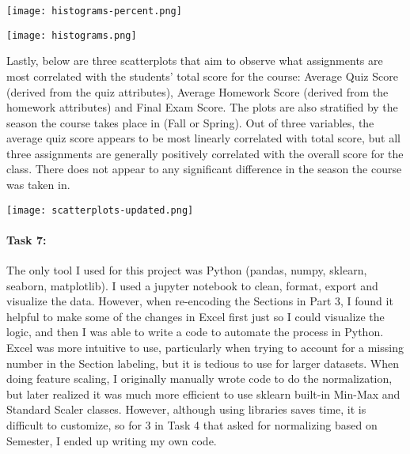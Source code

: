 \documentclass{article}
\begin{document}
\hspace*{-1.5cm}  
    \texttt{[image: histograms-percent.png]}

\hspace*{-1.5cm}  
    \texttt{[image: histograms.png]}


Lastly, below are three scatterplots that aim to observe  what assignments are most correlated with the students' total score for the course: Average Quiz Score (derived from the quiz attributes), Average Homework Score (derived from the homework attributes) and Final Exam Score. The plots are also stratified by the season the course takes place in (Fall or Spring). Out of three variables, the average quiz score appears to be most linearly correlated with total score, but all three assignments are generally positively correlated with the overall score for the class. There does not appear to any significant difference in the season the course was taken in. 

\hspace*{-2.6cm}  
    \texttt{[image: scatterplots-updated.png]}

\paragraph{\textbf{Task 7:}} The only tool I used for this project was Python (pandas, numpy, sklearn, seaborn, matplotlib). I used a jupyter notebook to clean, format, export and visualize the data. However, when re-encoding the Sections in Part 3, I found it helpful to make some of the changes in Excel first just so I could visualize the logic, and then I was able to write a code to automate the process in Python. Excel was more intuitive to use, particularly when trying to account for a missing number in the Section labeling, but it is tedious to use for larger datasets. When doing feature scaling, I originally manually wrote code to do the normalization, but later realized it was much more efficient to use sklearn built-in Min-Max and Standard Scaler classes. However, although using libraries saves  time, it is difficult to customize, so for 3 in Task 4 that asked for normalizing based on Semester, I ended up writing my own code. 
\end{document}
